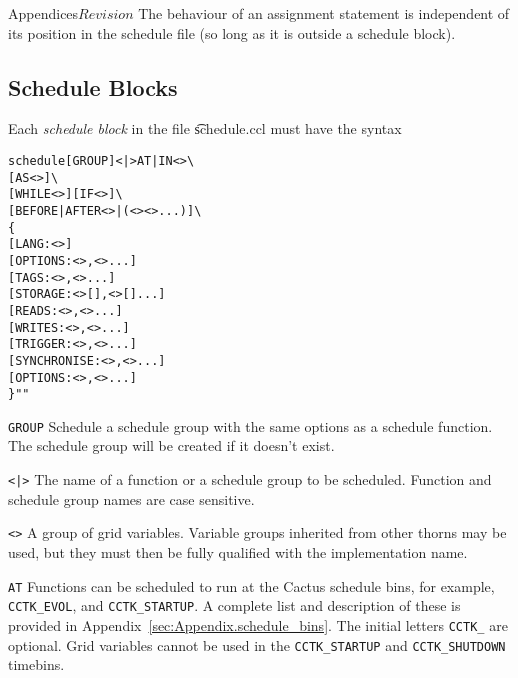 \begin{cactuspart}{Appendices}{}{$Revision$}
The behaviour of an assignment statement is independent of its
position in the schedule file (so long as it is outside a schedule
block). 

\subsection{Schedule Blocks}

Each \textit{schedule block} in the file {\t schedule.ccl} must have the syntax

\begin{alltt}
schedule [GROUP] <|> AT|IN <> \verb|\|
     [AS <>] \verb|\|
     [WHILE <>] [IF <>] \verb|\|
     [BEFORE|AFTER <>|(<> <> ...)] \verb|\|
\{
  [LANG: <>]
  [OPTIONS:       <>,<>...]
  [TAGS:          <>,<>...]
  [STORAGE:       <>[],<>[]...]
  [READS:         <>,<>...]
  [WRITES:        <>,<>...]
  [TRIGGER:       <>,<>...]
  [SYNCHRONISE:   <>,<>...]
  [OPTIONS:       <>,<>...]
\} ""
\end{alltt}

\begin{Lentry}
  \item[{\tt GROUP}] Schedule a schedule group with the same options
  as a schedule function.  The schedule group will be created if it doesn't exist.

  \item[{\tt <\var{function name}|\var{group name}>}] The name of a function or a
  schedule group to be scheduled.  Function and schedule group names
  are case sensitive.

  \item[{\tt <\var{group}>}] A group of grid variables. Variable groups
  inherited from other thorns may be used, but they must then be fully
  qualified with the implementation name.

  \item[{\tt AT}] Functions can be scheduled to run at the Cactus
  schedule bins, for example, {\tt CCTK\_EVOL}, and {\tt CCTK\_STARTUP}. A
  complete list and description of these is provided in
  Appendix~\ref{sec:Appendix.schedule_bins}.  The initial letters
  {\tt CCTK\_} are optional. Grid variables cannot be used in the
  {\tt CCTK\_STARTUP} and {\tt CCTK\_SHUTDOWN} timebins.


\end{Lentry}
\end{cactuspart}
